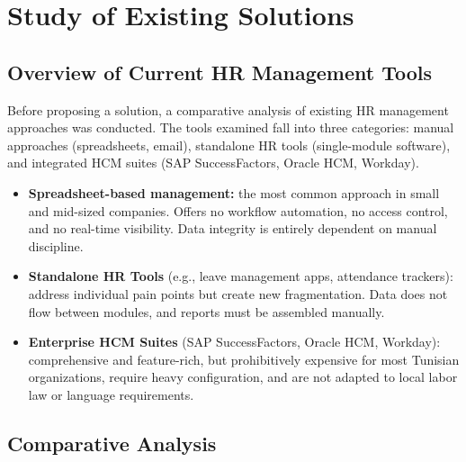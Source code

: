 \documentclass[12pt,a4paper]{report}
\begin{document}
\section{Study of Existing Solutions}

\subsection{Overview of Current HR Management Tools}

Before proposing a solution, a comparative analysis of existing HR management approaches
was conducted. The tools examined fall into three categories: manual approaches
(spreadsheets, email), standalone HR tools (single-module software), and integrated
HCM suites (SAP SuccessFactors, Oracle HCM, Workday).

\begin{itemize}
  \item \textbf{Spreadsheet-based management:} the most common approach in small and
    mid-sized companies. Offers no workflow automation, no access control, and no
    real-time visibility. Data integrity is entirely dependent on manual discipline.

  \item \textbf{Standalone HR Tools} (e.g., leave management apps, attendance trackers):
    address individual pain points but create new fragmentation. Data does not flow
    between modules, and reports must be assembled manually.

  \item \textbf{Enterprise HCM Suites} (SAP SuccessFactors, Oracle HCM, Workday):
    comprehensive and feature-rich, but prohibitively expensive for most Tunisian
    organizations, require heavy configuration, and are not adapted to local labor law
    or language requirements.
\end{itemize}

\subsection{Comparative Analysis}
\end{document}
